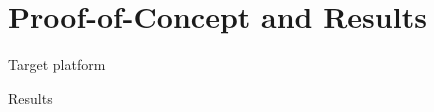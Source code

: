 \section{Proof-of-Concept and Results}

\begin{frame}{Target platform}
  
\end{frame}

\begin{frame}{Results}

\end{frame}
